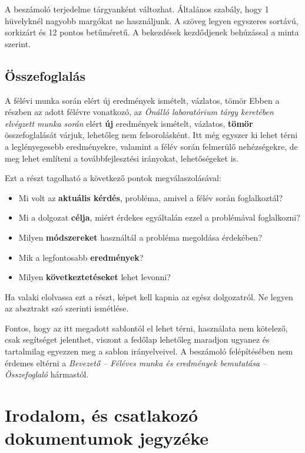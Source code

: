 \documentclass[a4paper,oneside]{article}
\begin{document}
A beszámoló terjedelme tárgyanként változhat.  Általános szabály, hogy
1 hüvelyknél nagyobb margókat ne használjunk.  A szöveg legyen
egyszeres sortávú, sorkizárt és 12 pontos betűméretű.  A bekezdések
kezdődjenek behúzással a minta szerint.

\subsection{Összefoglalás}
\label{sec:osszefoglalas}

A félévi munka során elért új eredmények ismételt, vázlatos, tömör
Ebben a részben az adott félévre vonatkozó, az \emph{Önálló
  laboratórium tárgy keretében elvégzett munka során} elért
\textbf{új} eredmények ismételt, vázlatos, \textbf{tömör}
összefoglalását várjuk, lehetőleg nem felsorolásként.  Itt még egyszer
ki lehet térni a leglényegesebb eredményekre, valamint a félév során
felmerülő nehézségekre, de meg lehet említeni a továbbfejlesztési
irányokat, lehetőségeket is.

Ezt a részt tagolható a következő pontok megválaszolásával:
\begin{itemize}
\item Mi volt az \textbf{aktuális kérdés}, probléma, amivel a félév
  során foglalkoztál?
\item Mi a dolgozat \textbf{célja}, miért érdekes egyáltalán ezzel a
  problémával foglalkozni?
\item Milyen \textbf{módszereket} használtál a probléma megoldása
  érdekében?
\item Mik a legfontosabb \textbf{eredmények}?
\item Milyen \textbf{következtetéseket} lehet levonni?

\end{itemize}

Ha valaki elolvassa ezt a részt, képet kell kapnia az egész
dolgozatról.  Ne legyen az absztrakt szó szerinti ismétlése.

Fontos, hogy az itt megadott sablontól el lehet térni, használata nem
kötelező, csak segítséget jelenthet, viszont a fedőlap lehetőleg
maradjon ugyanez és tartalmilag egyezzen meg a sablon irányelveivel. A
beszámoló felépítésében nem érdemes eltérni a \emph{Bevezető --
  Féléves munka és eredmények bemutatása -- Összefoglaló} hármastól.

\newpage
 
\section{Irodalom, és csatlakozó dokumentumok jegyzéke}
\label{sec:irod-es-csatl}
\end{document}
